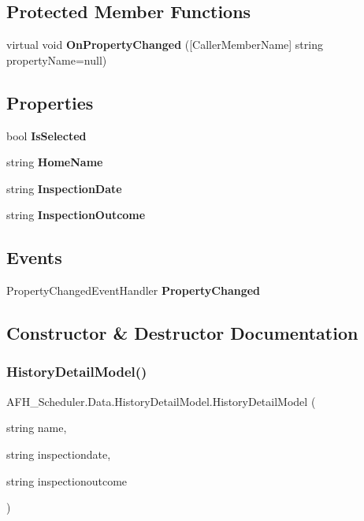 \subsection*{Protected Member Functions}
\begin{DoxyCompactItemize}
\item 
virtual void \textbf{ On\+Property\+Changed} ([Caller\+Member\+Name] string property\+Name=null)
\end{DoxyCompactItemize}
\subsection*{Properties}
\begin{DoxyCompactItemize}
\item 
bool \textbf{ Is\+Selected}\hspace{0.3cm}{\ttfamily  [get, set]}
\item 
string \textbf{ Home\+Name}\hspace{0.3cm}{\ttfamily  [get, set]}
\item 
string \textbf{ Inspection\+Date}\hspace{0.3cm}{\ttfamily  [get, set]}
\item 
string \textbf{ Inspection\+Outcome}\hspace{0.3cm}{\ttfamily  [get, set]}
\end{DoxyCompactItemize}
\subsection*{Events}
\begin{DoxyCompactItemize}
\item 
Property\+Changed\+Event\+Handler \textbf{ Property\+Changed}
\end{DoxyCompactItemize}


\subsection{Constructor \& Destructor Documentation}
\mbox{\label{class_a_f_h___scheduler_1_1_data_1_1_history_detail_model_aa55882f1f37ea3989ad391d39629cc1c}} 
\subsubsection{HistoryDetailModel()}
{\footnotesize\ttfamily A\+F\+H\+\_\+\+Scheduler.\+Data.\+History\+Detail\+Model.\+History\+Detail\+Model (\begin{DoxyParamCaption}\item[{string}]{name,  }\item[{string}]{inspectiondate,  }\item[{string}]{inspectionoutcome }\end{DoxyParamCaption})}



